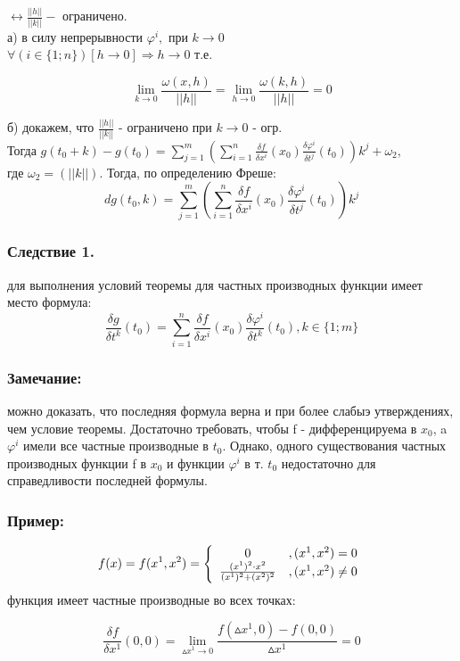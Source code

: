 $
\leftrightarrow \frac{||h||}{||k||}-
$
ограничено.
\\
а) в силу непрерывности $\varphi^i,$ при $k\to 0$
\\
$\forall(i\in\{1;n\})[h\to 0]\Rightarrow h\to 0$ т.е.

$$
\lim_{k\to 0}\frac{\omega(x,h)}{||h||}= \lim_{h\to 0}\frac{\omega(k,h)}{||h||}=0
$$

б) докажем, что $\frac{||h||}{||k||}$ - ограничено при $k\to 0$ - огр.
\\
Тогда $g(t_0+k)-g(t_0)=\sum_{j=1}^{m}(\sum_{i=1}^{n}\frac{\delta f}{\delta x^i}(x_0)\frac{\delta\varphi^i}{\delta t^j}(t_0))k^j+\omega_2$,
\\
где $\omega_2=(||k||).$ Тогда, по определению Фреше:
$$
dg(t_0,k)=\sum_{j=1}^{m}(\sum_{i=1}^{n}\frac{\delta f}{\delta x^i}(x_0)\frac{\delta\varphi^i}{\delta t^j}(t_0))k^j
$$
\dokno

\subsubsection{Следствие 1.}
для выполнения условий теоремы для частных производных функции имеет место формула:
$$
\frac{\delta g}{\delta t^k}(t_0) = \sum_{i=1}^{n}\frac{\delta f}{\delta x^i}(x_0)\frac{\delta\varphi^i}{\delta t^k}(t_0), k\in\{1;m\}
$$

\subsubsection{Замечание:}
можно доказать, что последняя формула верна и при более слабыэ утверждениях, чем условие теоремы. Достаточно требовать, чтобы f - дифференцируема в $x_0$, a $\varphi^i$ имели все частные производные в $t_0.$ Однако, одного существования частных производных функции f в $x_0$ и функции $\varphi^i$ в т. $t_0$ недостаточно для справедливости последней формулы.

\subsubsection{Пример:}
$$
f(x)=f(x^1,x^2)=\left\{\begin{array}{c c}
0 & ,(x^1,x^2) = 0\\
\frac{(x^1)^2\cdot x^2}{(x^1)^2+(x^2)^2} & ,(x^1,x^2)\ne 0
\end{array}\right.
$$ 
функция имеет частные производные во всех точках:

$$
\frac{\delta f}{\delta x^1}(0,0) = \lim_{\vartriangle x^1\to 0}\frac{f(\vartriangle x^1,0) - f(0,0)}{\vartriangle x^1}=0
$$

